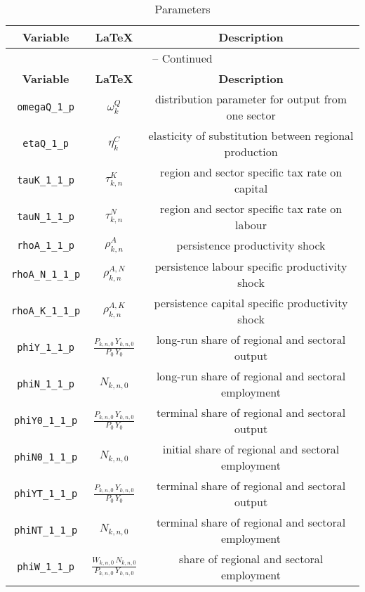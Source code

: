 \begin{center}
\begin{longtable}{ccc}
\caption{Parameters}\\%
\hline%
\multicolumn{1}{c}{\textbf{Variable}} &
\multicolumn{1}{c}{\textbf{\LaTeX}} &
\multicolumn{1}{c}{\textbf{Description}}\\%
\hline\hline%
\endfirsthead
\multicolumn{3}{c}{{\tablename} \thetable{} -- Continued}\\%
\hline%
\multicolumn{1}{c}{\textbf{Variable}} &
\multicolumn{1}{c}{\textbf{\LaTeX}} &
\multicolumn{1}{c}{\textbf{Description}}\\%
\hline\hline%
\endhead
\texttt{omegaQ\_1\_p} & ${\omega^{Q}_{k}}$ & distribution parameter for output from one sector\\
\texttt{etaQ\_1\_p} & ${\eta^{C}_{k}}$ & elasticity of substitution between regional production\\
\texttt{tauK\_1\_1\_p} & ${\tau^{K}_{k,n}}$ & region and sector specific tax rate on capital\\
\texttt{tauN\_1\_1\_p} & ${\tau^{N}_{k,n}}$ & region and sector specific tax rate on labour\\
\texttt{rhoA\_1\_1\_p} & ${\rho^{A}_{k,n}}$ & persistence productivity shock\\
\texttt{rhoA\_N\_1\_1\_p} & ${\rho^{A,N}_{k,n}}$ & persistence labour specific productivity shock\\
\texttt{rhoA\_K\_1\_1\_p} & ${\rho^{A,K}_{k,n}}$ & persistence capital specific productivity shock\\
\texttt{phiY\_1\_1\_p} & $\frac{P_{k,n,0} \, Y_{k,n,0}}{P_{0} \, Y_{0}}$ & long-run share of regional and sectoral output\\
\texttt{phiN\_1\_1\_p} & ${N_{k,n,0}}$ & long-run share of regional and sectoral employment\\
\texttt{phiY0\_1\_1\_p} & $\frac{P_{k,n,0} \, Y_{k,n,0}}{P_{0} \, Y_{0}}$ & terminal share of regional and sectoral output\\
\texttt{phiN0\_1\_1\_p} & ${N_{k,n,0}}$ & initial share of regional and sectoral employment\\
\texttt{phiYT\_1\_1\_p} & $\frac{P_{k,n,0} \, Y_{k,n,0}}{P_{0} \, Y_{0}}$ & terminal share of regional and sectoral output\\
\texttt{phiNT\_1\_1\_p} & ${N_{k,n,0}}$ & terminal share of regional and sectoral employment\\
\texttt{phiW\_1\_1\_p} & $\frac{W_{k,n,0} \, N_{k,n,0}}{P_{k,n,0} \, Y_{k,n,0}}$ & share of regional and sectoral employment\\

\end{longtable}
\end{center}
